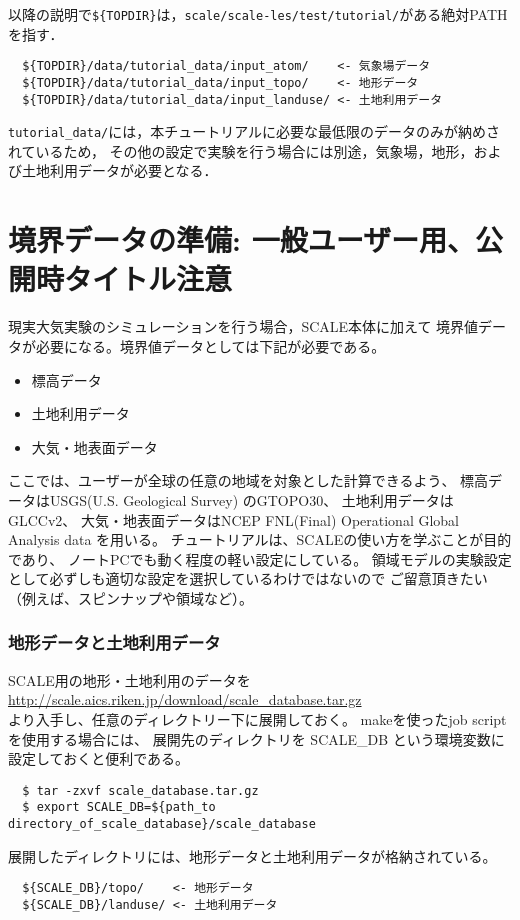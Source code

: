 以降の説明で\verb|${TOPDIR}|は，\verb|scale/scale-les/test/tutorial/|がある絶対PATHを指す．

\begin{verbatim}
  ${TOPDIR}/data/tutorial_data/input_atom/    <- 気象場データ
  ${TOPDIR}/data/tutorial_data/input_topo/    <- 地形データ
  ${TOPDIR}/data/tutorial_data/input_landuse/ <- 土地利用データ
\end{verbatim}
\verb|tutorial_data/|には，本チュートリアルに必要な最低限のデータのみが納めされているため，
その他の設定で実験を行う場合には別途，気象場，地形，および土地利用データが必要となる．


\section{境界データの準備: 一般ユーザー用、公開時タイトル注意}

現実大気実験のシミュレーションを行う場合，SCALE本体に加えて
境界値データが必要になる。境界値データとしては下記が必要である。
\begin{itemize}
\item 標高データ
\item 土地利用データ
\item 大気・地表面データ
\end{itemize}

ここでは、ユーザーが全球の任意の地域を対象とした計算できるよう、
標高データはUSGS(U.S. Geological Survey) のGTOPO30、
土地利用データはGLCCv2、
大気・地表面データはNCEP FNL(Final) Operational Global Analysis data
を用いる。
チュートリアルは、SCALEの使い方を学ぶことが目的であり、
ノートPCでも動く程度の軽い設定にしている。
領域モデルの実験設定として必ずしも適切な設定を選択しているわけではないので
ご留意頂きたい（例えば、スピンナップや領域など）。


\subsubsection{地形データと土地利用データ}

SCALE用の地形・土地利用のデータを\\
 \url{http://scale.aics.riken.jp/download/scale_database.tar.gz}\\
より入手し、任意のディレクトリー下に展開しておく。
makeを使ったjob scriptを使用する場合には、
展開先のディレクトリを SCALE\_DB という環境変数に設定しておくと便利である。
\begin{verbatim}
  $ tar -zxvf scale_database.tar.gz
  $ export SCALE_DB=${path_to directory_of_scale_database}/scale_database
\end{verbatim}
展開したディレクトリには、地形データと土地利用データが格納されている。
\begin{verbatim}
  ${SCALE_DB}/topo/    <- 地形データ
  ${SCALE_DB}/landuse/ <- 土地利用データ
\end{verbatim}



